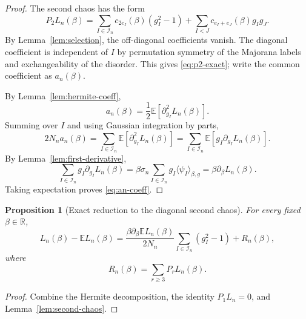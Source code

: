 \documentclass[11pt]{article}
\newtheorem{proposition}[theorem]{Proposition}
\newcommand{\E}{\mathbb{E}}
\newcommand{\R}{\mathbb{R}}
\newcommand{\calI}{\mathcal{I}}
\begin{document}
\begin{proof}
  The second chaos has the form
  \begin{equation}\label{eq:p2-general}
    P_2L_n(\beta)
    =
    \sum_{I\in\calI_n}c_{2e_I}(\beta)(g_I^2-1)
    +
    \sum_{I<J}c_{e_I+e_J}(\beta)g_Ig_J.
  \end{equation}
  By Lemma~\ref{lem:selection}, the off-diagonal coefficients vanish.  The
  diagonal coefficient is independent of $I$ by permutation symmetry of the
  Majorana labels and exchangeability of the disorder.  This gives
  \eqref{eq:p2-exact}; write the common coefficient as $a_n(\beta)$.

  By Lemma~\ref{lem:hermite-coeff},
  \begin{equation}\label{eq:an-second-derivative}
    a_n(\beta)=\frac12\E[\partial_{g_I}^2L_n(\beta)].
  \end{equation}
  Summing over $I$ and using Gaussian integration by parts,
  \begin{equation}\label{eq:gibp-second-chaos}
    2N_na_n(\beta)
    =
    \sum_{I\in\calI_n}\E[\partial_{g_I}^2L_n(\beta)]
    =
    \sum_{I\in\calI_n}\E[g_I\partial_{g_I}L_n(\beta)].
  \end{equation}
  By Lemma~\ref{lem:first-derivative},
  \begin{equation}\label{eq:g-derivative-sum}
    \sum_{I\in\calI_n}g_I\partial_{g_I}L_n(\beta)
    =
    \beta\sigma_n\sum_{I\in\calI_n}g_I\langle\psi_I\rangle_{\beta,g}
    =
    \beta\partial_\beta L_n(\beta).
  \end{equation}
  Taking expectation proves \eqref{eq:an-coeff}.
\end{proof}

\begin{proposition}[Exact reduction to the diagonal second chaos]
  \label{prop:exact-reduction}
  For every fixed $\beta\in\R$,
  \begin{equation}\label{eq:exact-reduction}
    L_n(\beta)-\E L_n(\beta)
    =
    \frac{\beta\partial_\beta\E L_n(\beta)}{2N_n}
    \sum_{I\in\calI_n}(g_I^2-1)
    +
    R_n(\beta),
  \end{equation}
  where
  \begin{equation}\label{eq:Rn}
    R_n(\beta)=\sum_{r\geq3}P_rL_n(\beta).
  \end{equation}
\end{proposition}

\begin{proof}
  Combine the Hermite decomposition, the identity $P_1L_n=0$, and
  Lemma~\ref{lem:second-chaos}.
\end{proof}
\end{document}
